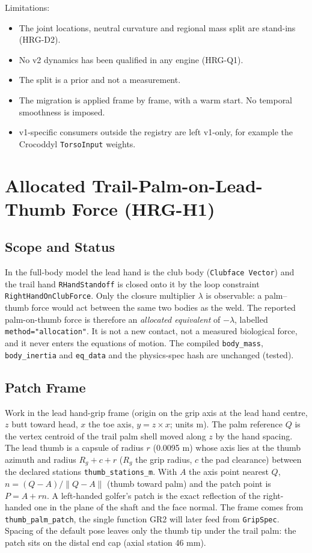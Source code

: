 \documentclass[11pt,a4paper]{article}
\begin{document}
Limitations:
\begin{itemize}
\item The joint locations, neutral curvature and regional mass split are
stand-ins (HRG-D2).
\item No v2 dynamics has been qualified in any engine (HRG-Q1).
\item The split is a prior and not a measurement.
\item The migration is applied frame by frame, with a warm start. No temporal
smoothness is imposed.
\item v1-specific consumers outside the registry are left v1-only, for example
the Crocoddyl \texttt{TorsoInput} weights.
\end{itemize}

\section{Allocated Trail-Palm-on-Lead-Thumb Force (HRG-H1)}
\subsection{Scope and Status}
In the full-body model the lead hand is the club body (\texttt{Clubface Vector})
and the trail hand \texttt{RHandStandoff} is closed onto it by the loop
constraint \texttt{RightHandOnClubForce}. Only the closure multiplier
$\lambda$ is observable: a palm--thumb force would act between the same two
bodies as the weld. The reported palm-on-thumb force is therefore an
\emph{allocated equivalent} of $-\lambda$, labelled \texttt{method="allocation"}.
It is not a new contact, not a measured biological force, and it never enters
the equations of motion. The compiled \texttt{body\_mass}, \texttt{body\_inertia}
and \texttt{eq\_data} and the physics-spec hash are unchanged (tested).

\subsection{Patch Frame}
Work in the lead hand-grip frame (origin on the grip axis at the lead hand
centre, $z$ butt toward head, $x$ the toe axis, $y=z\times x$; units m). The
palm reference $Q$ is the vertex centroid of the trail palm shell moved along
$z$ by the hand spacing. The lead thumb is a capsule of radius $r$ (0.0095 m)
whose axis lies at the thumb azimuth and radius $R_g+c+r$ ($R_g$ the grip
radius, $c$ the pad clearance) between the declared stations
\texttt{thumb\_stations\_m}. With $A$ the axis point nearest $Q$,
$n=(Q-A)/\lVert Q-A\rVert$ (thumb toward palm) and the patch point is
$P=A+rn$. A left-handed golfer's patch is the exact reflection of the
right-handed one in the plane of the shaft and the face normal. The frame
comes from \texttt{thumb\_palm\_patch}, the single function GR2 will later feed
from \texttt{GripSpec}. Spacing of the default pose leaves only the thumb tip
under the trail palm: the patch sits on the distal end cap (axial station 46 mm).
\end{document}

